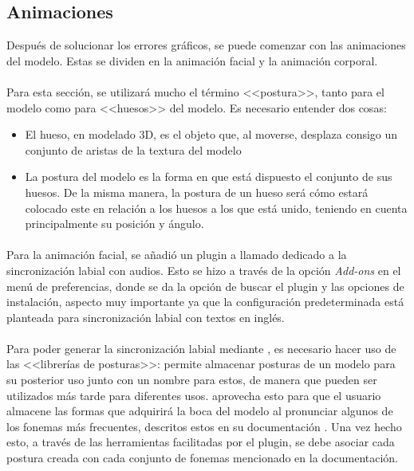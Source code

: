\documentclass{subfiles}
\begin{document}
    \subsection{Animaciones}
    \label{sec:4.2.2}
    Después de solucionar los errores gráficos, se puede comenzar con las animaciones del modelo. Estas se dividen en la animación facial y la animación corporal.

    \paragraph{}
    Para esta sección, se utilizará mucho el término <<postura>>, tanto para el modelo como para <<huesos>> del modelo. Es necesario entender dos cosas:
    \begin{itemize}
        \item El hueso, en modelado 3D, es el objeto que, al moverse, desplaza consigo un conjunto de aristas de la textura del modelo
        \item La postura del modelo es la forma en que está dispuesto el conjunto de sus huesos. De la misma manera, la postura de un hueso será cómo estará colocado este en relación a los huesos a los que está unido, teniendo en cuenta principalmente su posición y ángulo.
    \end{itemize}

    \paragraph{}
    Para la animación facial, se añadió un plugin a \blender llamado \rhubarb \cite{web:rhubarb} dedicado a la sincronización labial con audios. Esto se hizo a través de la opción \textit{Add-ons} en el menú de preferencias, donde se da la opción de buscar el plugin y las opciones de instalación, aspecto muy importante ya que la configuración predeterminada está planteada para sincronización labial con textos en inglés.

    \paragraph{}
    Para poder generar la sincronización labial mediante \rhubarb, es necesario hacer uso de las <<librerías de posturas>>: \blender permite almacenar posturas de un modelo para su posterior uso junto con un nombre para estos, de manera que pueden ser utilizados más tarde para diferentes usos. \rhubarb aprovecha esto para que el usuario almacene las formas que adquirirá la boca del modelo al pronunciar algunos de los fonemas más frecuentes, descritos estos en su documentación \cite{web:rhubarb_mouthshapes}. Una vez hecho esto, a través de las herramientas facilitadas por el plugin, se debe asociar cada postura creada con cada conjunto de fonemas mencionado en la documentación.
\end{document}
